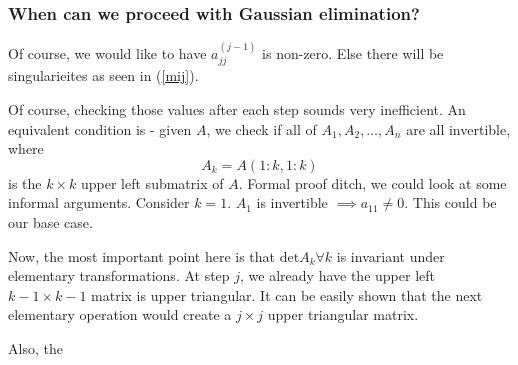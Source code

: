 \documentclass[a4paper]{article}
\begin{document}
\subsubsection*{When can we proceed with Gaussian elimination?}
Of course, we would like to have $a_{jj}^{(j-1)}$ is non-zero.
Else there will be singularieites as seen in (\ref{mij}).

Of course, checking those values after each step sounds
very inefficient. An equivalent condition is - given $A$, we check
if all of $A_1, A_2, \ldots, A_{n}$ are all invertible, where
\[
	A_k = A(1:k, 1:k)
\] 
is the $k\times k$ upper left submatrix of $A$. Formal proof ditch,
we could look at some informal arguments. Consider  $ k = 1$.
$A_1$ is invertible $\implies a_{11} \neq  0$. This could be our base
case.

Now, the most important point here is that $\text{det}A_k \forall k$ 
is invariant under elementary transformations.
At step $j$, we already have the upper left $k-1 \times  k-1$ matrix
is upper triangular. It can be easily shown that the next elementary
operation would create a $j \times  j$ upper triangular matrix.

Also, the 
\end{document}
